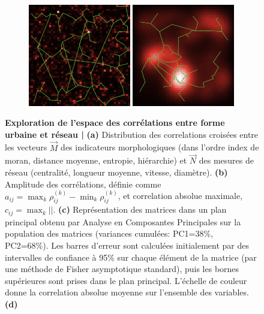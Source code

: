 \begin{figure}
\begin{subfigure}[t]{0.45\linewidth}
   \includegraphics[width=0.49\textwidth]{figures/configs/3_param71918_seed0}
   \includegraphics[width=0.49\textwidth]{figures/configs/4_param71945_seed0}
   \caption{}
\end{subfigure}

\caption{\small\textbf{Exploration de l'espace des corrélations entre forme urbaine et réseau | } \textbf{(a)} Distribution des correlations croisées entre les vecteurs $\vec{M}$ des indicateurs morphologiques (dans l'ordre index de moran, distance moyenne, entropie, hiérarchie) et $\vec{N}$ des mesures de réseau (centralité, longueur moyenne, vitesse, diamètre). \textbf{(b)} Amplitude des corrélations, définie comme $a_{ij}=\max_k{\rho_{ij}^{(k)}}-\min_k{\rho_{ij}^{(k)}}$, et correlation absolue maximale, $c_{ij}=\max_k\left| \right|$. \textbf{(c)} Représentation des matrices dans un plan principal obtenu par Analyse en Composantes Principales sur la population des matrices (variances cumulées: PC1=38\%, PC2=68\%). Les barres d'erreur sont calculées initialement par des intervalles de confiance à 95\% sur chaque élément de la matrice (par une méthode de Fisher asymptotique standard), puis les bornes supérieures sont prises dans le plan principal. L'échelle de couleur donne la correlation absolue moyenne sur l'ensemble des variables. \textbf{(d)} }
\label{fig:densnwcor}
\end{figure}



